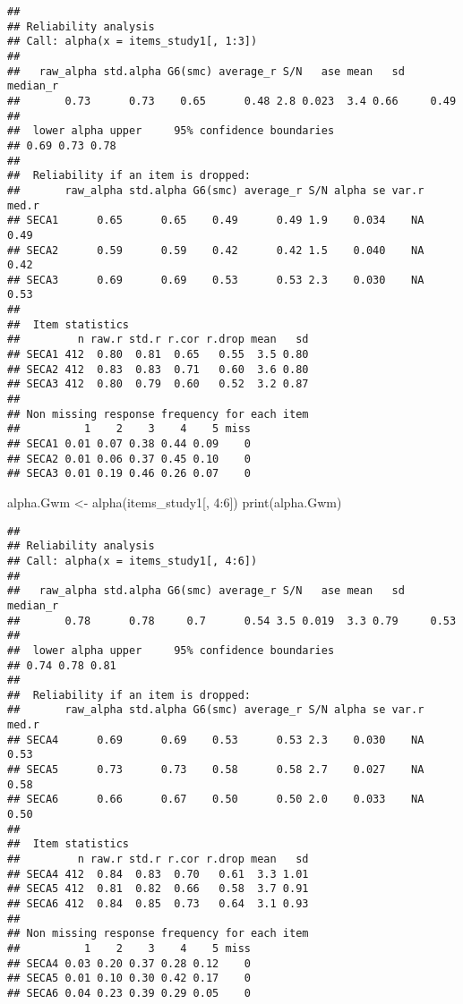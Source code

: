 \documentclass[
]{article}
\newenvironment{Shaded}{\begin{snugshade}}{\end{snugshade}}
\newcommand{\DecValTok}[1]{\textcolor[rgb]{0.00,0.00,0.81}{#1}}
\newcommand{\FunctionTok}[1]{\textcolor[rgb]{0.00,0.00,0.00}{#1}}
\newcommand{\NormalTok}[1]{#1}
\newcommand{\OtherTok}[1]{\textcolor[rgb]{0.56,0.35,0.01}{#1}}
\newcommand{\SpecialCharTok}[1]{\textcolor[rgb]{0.00,0.00,0.00}{#1}}
\begin{document}
\begin{verbatim}
## 
## Reliability analysis   
## Call: alpha(x = items_study1[, 1:3])
## 
##   raw_alpha std.alpha G6(smc) average_r S/N   ase mean   sd median_r
##       0.73      0.73    0.65      0.48 2.8 0.023  3.4 0.66     0.49
## 
##  lower alpha upper     95% confidence boundaries
## 0.69 0.73 0.78 
## 
##  Reliability if an item is dropped:
##       raw_alpha std.alpha G6(smc) average_r S/N alpha se var.r med.r
## SECA1      0.65      0.65    0.49      0.49 1.9    0.034    NA  0.49
## SECA2      0.59      0.59    0.42      0.42 1.5    0.040    NA  0.42
## SECA3      0.69      0.69    0.53      0.53 2.3    0.030    NA  0.53
## 
##  Item statistics 
##         n raw.r std.r r.cor r.drop mean   sd
## SECA1 412  0.80  0.81  0.65   0.55  3.5 0.80
## SECA2 412  0.83  0.83  0.71   0.60  3.6 0.80
## SECA3 412  0.80  0.79  0.60   0.52  3.2 0.87
## 
## Non missing response frequency for each item
##          1    2    3    4    5 miss
## SECA1 0.01 0.07 0.38 0.44 0.09    0
## SECA2 0.01 0.06 0.37 0.45 0.10    0
## SECA3 0.01 0.19 0.46 0.26 0.07    0
\end{verbatim}

\begin{Shaded}
\begin{Highlighting}[]
\NormalTok{alpha.Gwm }\OtherTok{\textless{}{-}} \FunctionTok{alpha}\NormalTok{(items\_study1[, }\DecValTok{4}\SpecialCharTok{:}\DecValTok{6}\NormalTok{])}
\FunctionTok{print}\NormalTok{(alpha.Gwm)}
\end{Highlighting}
\end{Shaded}

\begin{verbatim}
## 
## Reliability analysis   
## Call: alpha(x = items_study1[, 4:6])
## 
##   raw_alpha std.alpha G6(smc) average_r S/N   ase mean   sd median_r
##       0.78      0.78     0.7      0.54 3.5 0.019  3.3 0.79     0.53
## 
##  lower alpha upper     95% confidence boundaries
## 0.74 0.78 0.81 
## 
##  Reliability if an item is dropped:
##       raw_alpha std.alpha G6(smc) average_r S/N alpha se var.r med.r
## SECA4      0.69      0.69    0.53      0.53 2.3    0.030    NA  0.53
## SECA5      0.73      0.73    0.58      0.58 2.7    0.027    NA  0.58
## SECA6      0.66      0.67    0.50      0.50 2.0    0.033    NA  0.50
## 
##  Item statistics 
##         n raw.r std.r r.cor r.drop mean   sd
## SECA4 412  0.84  0.83  0.70   0.61  3.3 1.01
## SECA5 412  0.81  0.82  0.66   0.58  3.7 0.91
## SECA6 412  0.84  0.85  0.73   0.64  3.1 0.93
## 
## Non missing response frequency for each item
##          1    2    3    4    5 miss
## SECA4 0.03 0.20 0.37 0.28 0.12    0
## SECA5 0.01 0.10 0.30 0.42 0.17    0
## SECA6 0.04 0.23 0.39 0.29 0.05    0
\end{verbatim}
\end{document}
